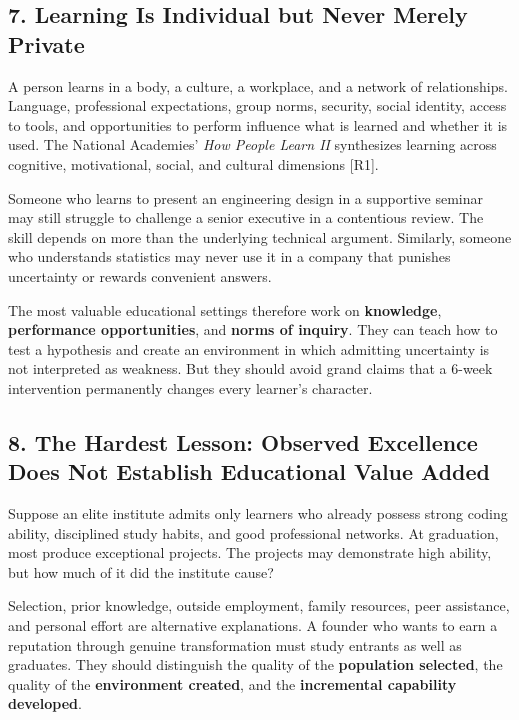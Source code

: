 \subsection*{7. Learning Is Individual but Never Merely Private}

A person learns in a body, a culture, a workplace, and a network of relationships. Language, professional expectations, group norms, security, social identity, access to tools, and opportunities to perform influence what is learned and whether it is used. The National Academies' \emph{How People Learn II} synthesizes learning across cognitive, motivational, social, and cultural dimensions [R1].

Someone who learns to present an engineering design in a supportive seminar may still struggle to challenge a senior executive in a contentious review. The skill depends on more than the underlying technical argument. Similarly, someone who understands statistics may never use it in a company that punishes uncertainty or rewards convenient answers.

The most valuable educational settings therefore work on \textbf{knowledge}, \textbf{performance opportunities}, and \textbf{norms of inquiry}. They can teach how to test a hypothesis and create an environment in which admitting uncertainty is not interpreted as weakness. But they should avoid grand claims that a 6-week intervention permanently changes every learner's character.

\subsection*{8. The Hardest Lesson: Observed Excellence Does Not Establish Educational Value Added}

Suppose an elite institute admits only learners who already possess strong coding ability, disciplined study habits, and good professional networks. At graduation, most produce exceptional projects. The projects may demonstrate high ability, but how much of it did the institute cause?

Selection, prior knowledge, outside employment, family resources, peer assistance, and personal effort are alternative explanations. A founder who wants to earn a reputation through genuine transformation must study entrants as well as graduates. They should distinguish the quality of the \textbf{population selected}, the quality of the \textbf{environment created}, and the \textbf{incremental capability developed}.

